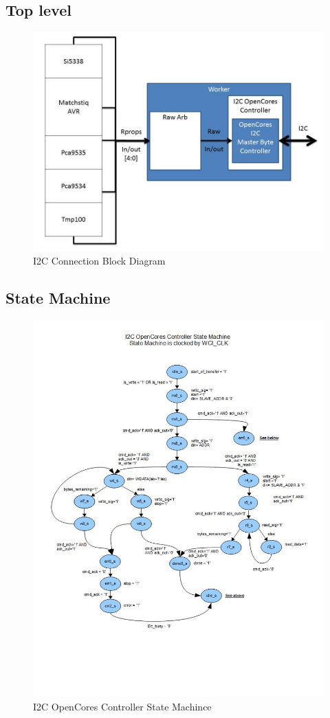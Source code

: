 \documentclass{article}
\begin{document}
\subsection*{Top level}
\begin{figure}[ht]
	\centerline{\includegraphics[scale=0.4]{block_diagram}}
	\caption{I2C Connection Block Diagram}
	\label{fig:tb}
\end{figure}
\subsection*{State Machine}
\begin{figure}[ht]
	\centerline{\includegraphics[scale=0.6]{state_machine_diagram}}
	\caption{I2C OpenCores Controller State Machince}
	\label{fig:tb}
\end{figure}
\end{document}
